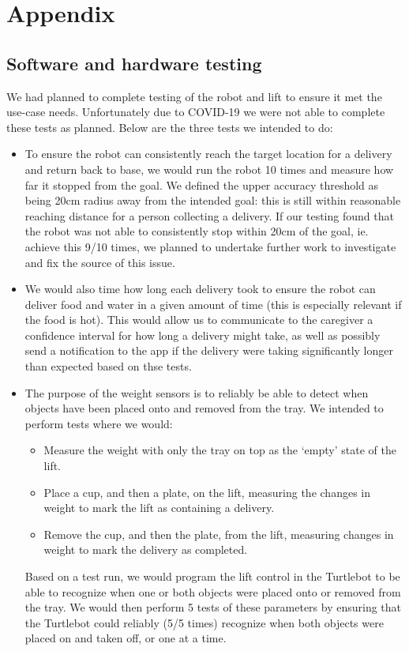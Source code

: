 \documentclass{article}
\begin{document}
\clearpage
\section{Appendix}
\subsection{Software and hardware testing}
We had planned to complete testing of the robot and lift to ensure it met the use-case needs. Unfortunately due to COVID-19 we were not able to complete these tests as planned. Below are the three tests we intended to do:

\begin{itemize}
\item To ensure the robot can consistently reach the target location for a delivery and return back to base, we would run the robot 10 times and measure how far it stopped from the goal. We defined the upper accuracy threshold as being 20cm radius away from the intended goal: this is still within reasonable reaching distance for a person collecting a delivery. If our testing found that the robot was not able to consistently stop within 20cm of the goal, ie. achieve this 9/10 times, we planned to undertake further work to investigate and fix the source of this issue. 
\item We would also time how long each delivery took to ensure the robot can deliver food and water in a given amount of time (this is especially relevant if the food is hot). This would allow us to communicate to the caregiver a confidence interval for how long a delivery might take, as well as possibly send a notification to the app if the delivery were taking significantly longer than expected based on thse tests.
\item The purpose of the weight sensors is to reliably be able to detect when objects have been placed onto and removed from the tray. We intended to perform tests where we would:
  \begin{itemize}
    \item Measure the weight with only the tray on top as the `empty' state of the lift.
    \item Place a cup, and then a plate, on the lift, measuring the changes in weight to mark the lift as containing a delivery. 
    \item Remove the cup, and then the plate, from the lift, measuring changes in weight to mark the delivery as completed. 
  \end{itemize}
  Based on a test run, we would program the lift control in the Turtlebot to be able to recognize when one or both objects were placed onto or removed from the tray. We would then perform 5 tests of these parameters by ensuring that the Turtlebot could reliably (5/5 times) recognize when both objects were placed on and taken off, or one at a time. 
\end{itemize}
\end{document}
